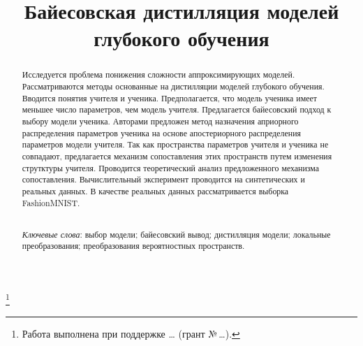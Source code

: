 \documentclass[12pt]{a&t}
\begin{document}


\title{Байесовская дистилляция моделей глубокого обучения}%
\thanks{Работа выполнена при поддержке \dots
(грант \mbox{№\,\dots}).}


\maketitle

\begin{abstract}
Исследуется проблема понижения сложности аппроксимирующих моделей. 
Рассматриваются методы основанные на дистилляции моделей глубокого обучения. 
Вводится понятия учителя и ученика. Предполагается, что модель ученика имеет меньшее число параметров, чем модель учителя. 
Предлагается байесовский подход к выбору модели ученика. 
Авторами предложен метод назначения априорного распределения параметров ученика на основе апостериорного распределения параметров модели учителя. 
Так как пространства параметров учителя и ученика не совпадают, предлагается механизм сопоставления этих пространств путем изменения струтктуры учителя.
Проводится теоретический анализ предложенного механизма сопоставления. Вычислительный эксперимент проводится на синтетических и реальных данных. В качестве реальных данных рассматривается выборка FashionMNIST.

\smallskip\\
\textit{Ключевые слова}: выбор модели; байесовский вывод; дистилляция модели; локальные преобразования; преобразования вероятностных пространств.
\end{abstract}
\end{document}
